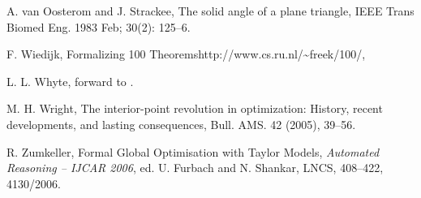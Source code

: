 \begin{thebibliography}{CHMS94}
 A. van Oosterom and J. Strackee, The solid
angle of a plane triangle, IEEE Trans Biomed Eng. 1983 Feb; 30(2):
125--6.

 F. Wiedijk, Formalizing 100
Theorems\hfil\break http://www.cs.ru.nl/\~{\hbox{}}freek/100/,

 L. L. Whyte, forward to \cite{Kep66}.

 M. H. Wright, The interior-point revolution in
optimization: History, recent developments, and lasting consequences,
Bull. AMS. 42 (2005), 39--56.


  R. Zumkeller,  Formal Global Optimisation with
 Taylor Models, {\it Automated Reasoning -- IJCAR 2006},
 ed. U. Furbach and N. Shankar, LNCS, 408--422, 4130/2006.




\end{thebibliography}
